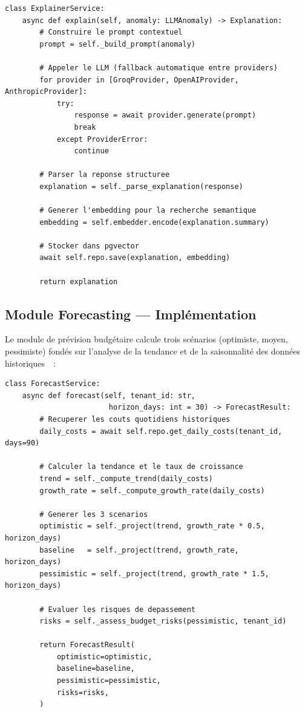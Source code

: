 \begin{lstlisting}[language=Python3, caption={Service d'explication IA (modules/detection/services/explainer\_service.py)}]
class ExplainerService:
    async def explain(self, anomaly: LLMAnomaly) -> Explanation:
        # Construire le prompt contextuel
        prompt = self._build_prompt(anomaly)
        
        # Appeler le LLM (fallback automatique entre providers)
        for provider in [GroqProvider, OpenAIProvider, AnthropicProvider]:
            try:
                response = await provider.generate(prompt)
                break
            except ProviderError:
                continue
        
        # Parser la reponse structuree
        explanation = self._parse_explanation(response)
        
        # Generer l'embedding pour la recherche semantique
        embedding = self.embedder.encode(explanation.summary)
        
        # Stocker dans pgvector
        await self.repo.save(explanation, embedding)
        
        return explanation
\end{lstlisting}


\subsection{Module Forecasting --- Implémentation}

Le module de prévision budgétaire calcule trois scénarios (optimiste, moyen, pessimiste) fondés sur l'analyse de la tendance et de la saisonnalité des données historiques~\cite{hyndman2018}~:

\begin{lstlisting}[language=Python3, caption={Service de prévision budgétaire (modules/forecasting/services/forecast\_service.py)}]
class ForecastService:
    async def forecast(self, tenant_id: str, 
                        horizon_days: int = 30) -> ForecastResult:
        # Recuperer les couts quotidiens historiques
        daily_costs = await self.repo.get_daily_costs(tenant_id, days=90)
        
        # Calculer la tendance et le taux de croissance
        trend = self._compute_trend(daily_costs)
        growth_rate = self._compute_growth_rate(daily_costs)
        
        # Generer les 3 scenarios
        optimistic = self._project(trend, growth_rate * 0.5, horizon_days)
        baseline   = self._project(trend, growth_rate,       horizon_days)
        pessimistic = self._project(trend, growth_rate * 1.5, horizon_days)
        
        # Evaluer les risques de depassement
        risks = self._assess_budget_risks(pessimistic, tenant_id)
        
        return ForecastResult(
            optimistic=optimistic,
            baseline=baseline,
            pessimistic=pessimistic,
            risks=risks,
        )
\end{lstlisting}


